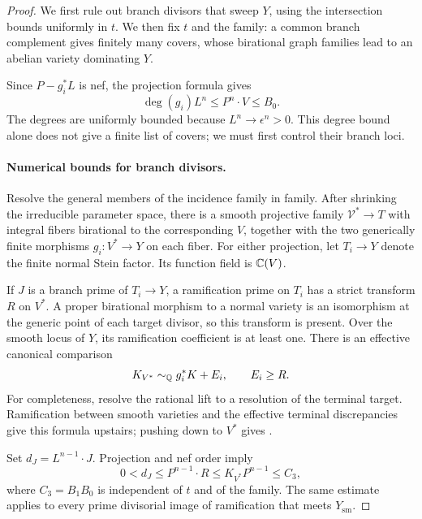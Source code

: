 \begin{proof}
We first rule out branch divisors that sweep \(Y\), using the
intersection bounds uniformly in \(t\). We then fix \(t\) and the
family: a common branch complement gives finitely many covers, whose
birational graph families lead to an abelian variety dominating \(Y\).

Since \(P-g_i^*L\) is nef, the projection formula gives
\begin{equation}\label{eq:two-slot-cover-degrees}
 \deg(g_i)L^n\le P^n\cdot V\le B_0.
\end{equation}
The degrees are uniformly bounded because \(L^n\to\epsilon^n>0\).
This degree bound alone does not give a finite list of covers; we
must first control their branch loci.

\paragraph{Numerical bounds for branch divisors.}
Resolve the general members of the incidence family in family.
After shrinking the irreducible parameter space, there is a smooth
projective family \(\mathcal V^*\to T\) with integral fibers
birational to the corresponding \(V\), together with the two
generically finite morphisms \(g_i:V^*\to Y\) on each fiber.
For either projection, let \(T_i\to Y\) denote the finite normal
Stein factor. Its function field is \(\mathbb C(V)\).

If \(J\) is a branch prime of \(T_i\to Y\), a ramification prime on
\(T_i\) has a strict transform \(R\) on \(V^*\). A proper birational
morphism to a normal variety is an isomorphism at the generic point
of each target divisor, so this transform is present. Over the
smooth locus of \(Y\), its ramification coefficient is at least one.
There is an effective canonical comparison
\begin{equation}\label{eq:two-slot-ramification}
 K_{V^*}\sim_{\mathbb Q}g_i^*K+E_i,\qquad E_i\ge R .
\end{equation}
For completeness, resolve the rational lift to a resolution of the
terminal target. Ramification between smooth varieties and the
effective terminal discrepancies give this formula upstairs;
pushing down to \(V^*\) gives .

Set \(d_J=L^{n-1}\cdot J\). Projection and nef order imply
\begin{equation}\label{eq:branch-degree}
 0<d_J
 \le P^{n-1}\cdot R
 \le K_{V^*}P^{n-1}
 \le C_3 ,
\end{equation}
where \(C_3=B_1B_0\) is independent of \(t\) and of the family.
The same estimate applies to every prime
divisorial image of ramification that meets \(Y_{\mathrm{sm}}\).


\end{proof}
